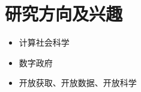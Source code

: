 \section{研究方向及兴趣}

\begin{itemize}
    \item 计算社会科学
    \item 数字政府
    \item 开放获取、开放数据、开放科学
\end{itemize}
